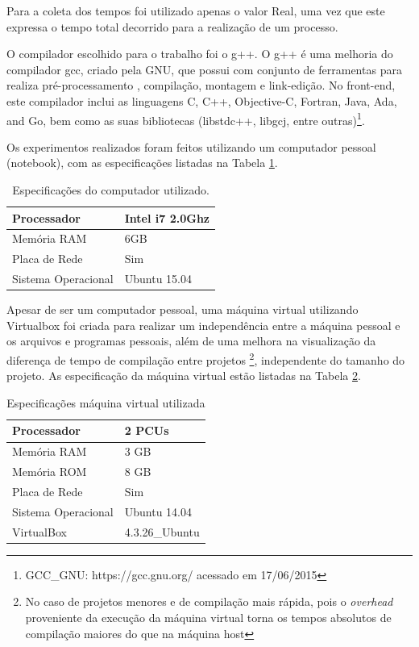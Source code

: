 Para a coleta dos tempos foi utilizado apenas o valor Real, uma vez que este
 expressa o tempo total decorrido para a realização de um processo.

O compilador escolhido para o trabalho foi o g++. O g++ é uma melhoria do
 compilador gcc, criado pela GNU, que possui com conjunto de ferramentas
 para realiza pré-processamento , compilação, montagem e link-edição.
 No front-end,  este compilador inclui as linguagens C, C++, Objective-C,
 Fortran, Java, Ada, and Go, bem como as suas bibliotecas  (libstdc++,
 libgcj, entre outras)\footnote{GCC\_GNU: https://gcc.gnu.org/ acessado
 em 17/06/2015}.


Os experimentos realizados foram feitos utilizando um computador pessoal
 (notebook), com  as especificações  listadas na Tabela 
\ref{tab:especificacoes_hardware}.


\begin{table}[h]
\centering
\begin{tabular}{|l|l|}
	\hline
	Processador         & Intel i7 2.0Ghz \\
	\hline
	Memória RAM         & 6GB             \\
	\hline
	Placa de Rede       & Sim             \\
	\hline
	Sistema Operacional & Ubuntu 15.04 \\
	\hline
\end{tabular}
\caption{Especificações do computador utilizado.}
\label{tab:especificacoes_hardware}
\end{table}


Apesar de ser um computador pessoal, uma máquina virtual utilizando Virtualbox
 foi criada para realizar um independência entre a máquina pessoal e os
 arquivos e programas pessoais, além de uma melhora  na visualização da
 diferença de tempo de compilação entre projetos
 \footnote{No caso de projetos menores e de compilação mais rápida, pois o 
\textit{overhead} proveniente da execução da máquina virtual torna os tempos
 absolutos de compilação maiores do que na máquina host}, independente do
 tamanho do projeto. As especificação da máquina virtual  estão listadas na
 Tabela \ref{tab:especificacoes_vm}.

\begin{table}[h]
	\centering
	\begin{tabular}{|l|l|}
		\hline
		Processador & 2 PCUs \\
		\hline
		Memória RAM & 3 GB \\
		\hline
		Memória ROM & 8 GB \\
		\hline
		Placa de Rede & Sim \\
		\hline
		Sistema Operacional & Ubuntu 14.04 \\
		\hline
		VirtualBox & 4.3.26\_Ubuntu \\
		\hline
	\end{tabular}
	\caption{Especificações máquina virtual utilizada}
	\label{tab:especificacoes_vm}
\end{table}


